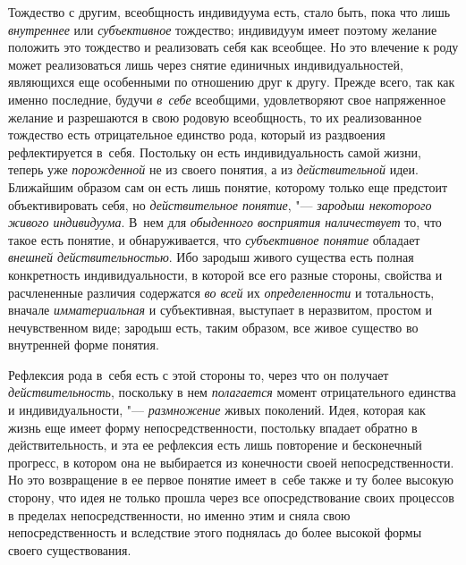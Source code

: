 Тождество с другим, всеобщность индивидуума есть, стало быть,
пока что лишь {\em внутреннее}
или {\em субъективное}
тождество; индивидуум имеет поэтому желание положить это
тождество и реализовать себя как всеобщее. Но это влечение к роду может
реализоваться лишь через снятие единичных индивидуальностей, являющихся еще
особенными по отношению друг к другу. Прежде всего, так как именно
последние, будучи {\em в~себе}
всеобщими, удовлетворяют свое напряженное желание и
разрешаются в свою родовую всеобщность, то их реализованное тождество есть
отрицательное единство рода, который из раздвоения рефлектируется в~себя.
Постольку он есть индивидуальность самой жизни, теперь уже
{\em порожденной} не из
своего понятия, а из
{\em действительной}
идеи. Ближайшим образом сам он есть лишь
понятие, которому только еще предстоит объективировать себя, но
{\em действительное понятие}, "---
{\em зародыш некоторого живого
индивидуума}. В~нем для
{\em обыденного восприятия
наличествует} то, что такое есть понятие, и обнаруживается,
что {\em субъективное понятие}
обладает {\em внешней
действительностью}. Ибо зародыш живого существа есть полная
конкретность индивидуальности, в которой все его разные стороны, свойства и
расчлененные различия содержатся {\em во
всей} их
{\em определенности} и
тотальность, вначале
{\em имматериальная} и
субъективная, выступает в неразвитом, простом и нечувственном виде; зародыш
есть, таким образом, все живое существо во внутренней форме понятия.

Рефлексия рода в~себя есть с этой стороны то, через что он
получает {\em действительность},
поскольку в нем
{\em полагается} момент
отрицательного единства и индивидуальности, "---
{\em размножение} живых
поколений. Идея, которая как жизнь еще имеет форму непосредственности,
постольку впадает обратно в действительность, и эта ее рефлексия есть лишь
повторение и бесконечный прогресс, в котором она не выбирается из
конечности своей непосредственности. Но это возвращение в ее первое понятие
имеет в~себе также и ту более высокую сторону, что идея не только прошла
через все опосредствование своих процессов в пределах непосредственности,
но именно этим и сняла свою непосредственность и вследствие этого поднялась
до более высокой формы своего существования.

